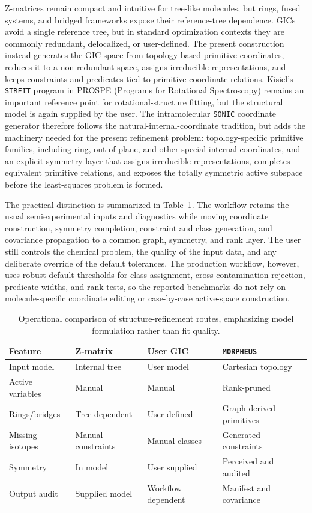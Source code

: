 \documentclass[aip,jcp,reprint,longbibliography,floatfix]{revtex4-2}
\begin{document}
Z-matrices remain compact and intuitive for tree-like molecules, but rings,
fused systems, and bridged frameworks expose their reference-tree
dependence.\cite{BakerHehre1991ZMatrix} GICs avoid a single reference tree, but
in standard optimization contexts they are commonly redundant, delocalized, or
user-defined. The present construction instead generates the GIC space from
topology-based primitive coordinates, reduces it to a non-redundant space,
assigns irreducible representations, and keeps constraints and predicates tied
to primitive-coordinate relations. Kisiel's \texttt{STRFIT} program in PROSPE
(Programs for Rotational Spectroscopy)\cite{KisielPROSPE} remains an important reference point for
rotational-structure fitting, but the structural model is again supplied by
the user.\cite{Kanzow2025PCCP}
The intramolecular \texttt{SONIC} coordinate generator therefore follows the
natural-internal-coordinate
tradition, but adds the machinery needed for the present refinement problem:
topology-specific primitive families, including ring, out-of-plane, and other
special internal coordinates, and an explicit symmetry layer that assigns
irreducible representations, completes equivalent primitive relations, and
exposes the totally symmetric active subspace before the least-squares problem
is formed.

The practical distinction is summarized in Table~\ref{tab:workflow-comparison}.
The workflow retains the usual semiexperimental inputs and diagnostics while
moving coordinate construction, symmetry completion, constraint and class
generation, and covariance propagation to a common graph, symmetry, and rank
layer. The user still controls the chemical problem, the quality of the input
data, and any deliberate override of the default tolerances. The production
workflow, however, uses robust default thresholds for class assignment,
cross-contamination rejection, predicate widths, and rank tests, so the
reported benchmarks do not rely on molecule-specific coordinate editing or
case-by-case active-space construction.

\begin{table}
\caption{Operational comparison of structure-refinement routes, emphasizing
model formulation rather than fit quality.}
\label{tab:workflow-comparison}
\footnotesize
\setlength{\tabcolsep}{5pt}
\begin{tabular}{@{}llll@{}}
\toprule
Feature & Z-matrix & User GIC & \texttt{MORPHEUS} \\
\midrule
Input model & Internal tree & User model & Cartesian topology \\
Active variables & Manual & Manual & Rank-pruned \\
Rings/bridges & Tree-dependent & User-defined & Graph-derived primitives \\
Missing isotopes & Manual constraints & Manual classes & Generated constraints \\
Symmetry & In model & User supplied & Perceived and audited \\
Output audit & Supplied model & Workflow dependent & Manifest and covariance \\
\bottomrule
\end{tabular}
\end{table}
\end{document}
